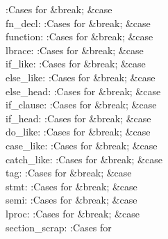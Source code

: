 :Cases for \X\5
\&{break};\6
\4\&{case} \\{fn\_decl}:\5
:Cases for \X\5
\&{break};\6
\4\&{case} \\{function}:\5
:Cases for \X\5
\&{break};\6
\4\&{case} \\{lbrace}:\5
:Cases for \X\5
\&{break};\6
\4\&{case} \\{if\_like}:\5
:Cases for \X\5
\&{break};\6
\4\&{case} \\{else\_like}:\5
:Cases for \X\5
\&{break};\6
\4\&{case} \\{else\_head}:\5
:Cases for \X\5
\&{break};\6
\4\&{case} \\{if\_clause}:\5
:Cases for \X\5
\&{break};\6
\4\&{case} \\{if\_head}:\5
:Cases for \X\5
\&{break};\6
\4\&{case} \\{do\_like}:\5
:Cases for \X\5
\&{break};\6
\4\&{case} \\{case\_like}:\5
:Cases for \X\5
\&{break};\6
\4\&{case} \\{catch\_like}:\5
:Cases for \X\5
\&{break};\6
\4\&{case} \\{tag}:\5
:Cases for \X\5
\&{break};\6
\4\&{case} \\{stmt}:\5
:Cases for \X\5
\&{break};\6
\4\&{case} \\{semi}:\5
:Cases for \X\5
\&{break};\6
\4\&{case} \\{lproc}:\5
:Cases for \X\5
\&{break};\6
\4\&{case} \\{section\_scrap}:\5
:Cases for \X\5
